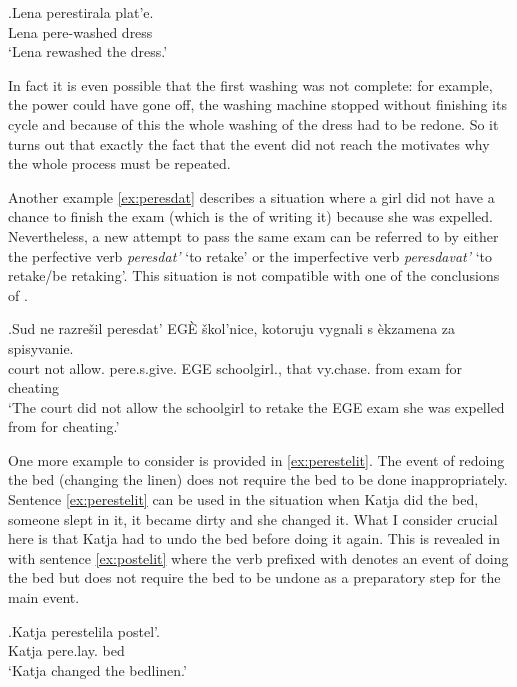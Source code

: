 \exg.\label{ex:perestirat}Lena perestirala plat'e.\\
Lena pere-washed dress\\
\trans `Lena rewashed the dress.'

In fact it is even possible that the first washing was not complete: for example, the power could have gone off, the washing machine stopped without finishing its cycle and because of this the whole washing of the dress had to be redone. So it turns out that exactly the fact that the event did not reach the  motivates why the whole process must be repeated.

Another example \ref{ex:peresdat} describes a situation where a girl did not have a chance to finish the exam (which is the  of writing it) because she was expelled. Nevertheless, a new attempt to pass the same exam can be referred to by either the perfective verb \textit{peresdat'} `to retake' or the imperfective verb \textit{peresdavat'} `to retake/be retaking'. This situation is not compatible with one of the conclusions of \citet{Kagan:book}.

\exg.\label{ex:peresdat}Sud ne razre\v{s}il peresdat' EG\`{E} \v{s}kol'nice, kotoruju vygnali s \`{e}kzamena za spisyvanie.\\
court not allow. pere.s.give. EGE schoolgirl., that vy.chase. from exam for cheating\\
\trans `The court did not allow the schoolgirl to retake the EGE exam she was expelled from for cheating.'

One more example to consider is provided in \ref{ex:perestelit}. The event of redoing the bed (changing the linen) does not require the bed to be done inappropriately. Sentence \ref{ex:perestelit} can be used in the situation when Katja did the bed, someone slept in it, it became dirty and she changed it. What I consider crucial here is that Katja had to undo the bed before doing it again. This is revealed in  with sentence \ref{ex:postelit} where the verb prefixed with  denotes an event of doing the bed but does not require the bed to be undone as a preparatory step for the main event. 

\exg.\label{ex:perestelit}Katja perestelila postel'.\\
Katja pere.lay. bed\\
\trans `Katja changed the bedlinen.'

